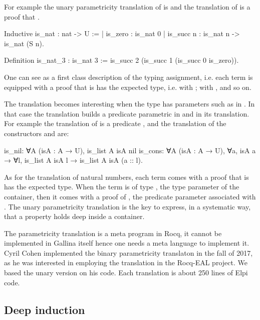 \documentclass[a4paper, 11pt]{book}
\begin{document}
For example the unary parametricity translation of
 is  and
the translation of  is a proof that .

\begin{rocqcode}
Inductive is_nat : nat -> U :=
| is_zero : is_nat 0
| is_succ n : is_nat n -> is_nat (S n).

Definition is_nat_3 : is_nat 3 :=
  is_succ 2 (is_succ 1 (is_succ 0 is_zero)).
\end{rocqcode}

One can see  as a first class description of the
typing assignment, i.e. each term is equipped with a proof that
is has the expected type, i.e.  with ;
 with , and so on.

The translation becomes interesting when the type has parameters such as
 in . In that case the translation builds
a predicate parametric in  and in its translation. For example
the translation of  is a predicate
,
and the translation of the constructors  and 
are:
\begin{rocqcode}
is_nil: ∀A (isA : A → U), is_list A isA nil
is_cons: ∀A (isA : A → U), ∀a, isA a → 
  ∀l, is_list A isA l → is_list A isA (a :: l).
\end{rocqcode}

As for the translation of natural numbers, each term comes with a proof
that is has the expected type. When the term is of type ,
the type parameter of the container, then it comes with a proof of ,
the predicate parameter associated with .
The unary parametricity translation is the key to express, in a
systematic way, that a property holds deep inside a container.

The parametricity translation is a meta program in Rocq, it cannot be implemented in
Gallina itself hence one needs a meta language to implement it.
Cyril Cohen implemented the binary parametricity translaton in the fall of 2017,
as he was interested in employing the translation in the Rocq-EAL project.
We based the unary version on his code. Each translation is about 250 lines
of Elpi code.

\subsection{Deep induction}
\end{document}
